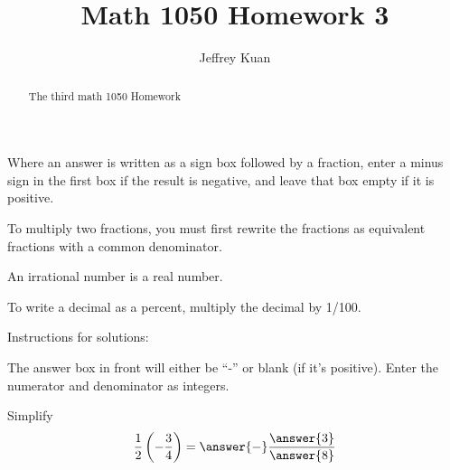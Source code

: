 \documentclass{ximera}
\author{Jeffrey Kuan}
\title{Math 1050 Homework 3}
\begin{document}
\begin{abstract}
   The third math 1050 Homework 
\end{abstract}

\maketitle

Where an answer is written as a sign box followed by a fraction, enter a minus sign in the first box if the result is negative, and leave that box empty if it is positive.

\begin{problem}

To multiply two fractions, you must first rewrite the fractions as equivalent fractions with a common denominator.

\begin{multipleChoice}
\end{multipleChoice}

\end{problem}

\begin{problem}

An irrational number is a real number.

\begin{multipleChoice}
\end{multipleChoice}
\end{problem}

\begin{problem}

To write a decimal as a percent, multiply the decimal by 1/100.

\begin{multipleChoice}
\end{multipleChoice}

\end{problem}

Instructions for solutions:

The answer box in front will either be ``-'' or blank (if it's positive). Enter the numerator and denominator as integers.
\begin{problem}
Simplify
\[
\frac{1}{2}\left( - \frac{3}{4} \right) = \answer{-}\frac{\answer{3}}{\answer{8}}
\]
\end{problem}
\end{document}
